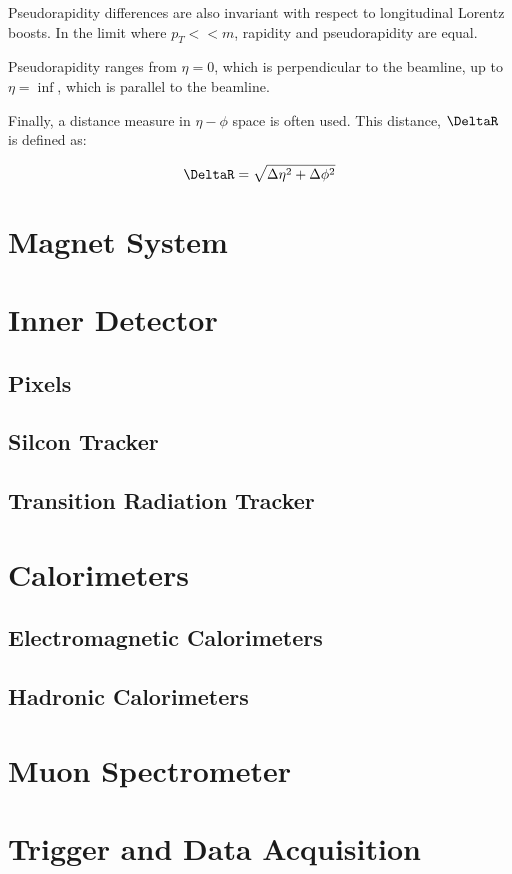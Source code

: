 Pseudorapidity differences are also invariant with respect to
longitudinal Lorentz boosts. In the limit where $p_T << m$, rapidity and
pseudorapidity are equal.

Pseudorapidity ranges from $\eta=0$, which is perpendicular to the
beamline, up to $\eta=\inf$, which is parallel to the beamline.

Finally, a distance measure in $\eta-\phi$ space is often used. This
distance, $\DeltaR$ is defined as:

\begin{equation}
\DeltaR = \sqrt{\Delta\eta^2+\Delta\phi^2}
\end{equation}


\section{Magnet System}
\section{Inner Detector}
\subsection{Pixels}
\subsection{Silcon Tracker}
\subsection{Transition Radiation Tracker}
\section{Calorimeters}
\subsection{Electromagnetic Calorimeters}
\subsection{Hadronic Calorimeters}
\section{Muon Spectrometer}
\section{Trigger and Data Acquisition}